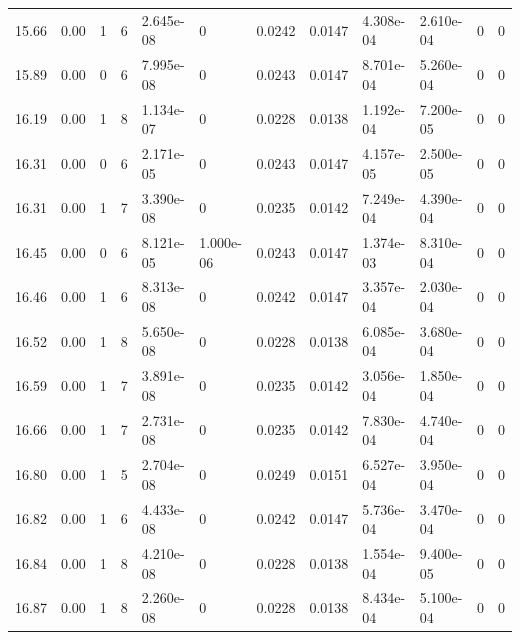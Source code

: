 \documentclass[preview]{standalone}
\begin{document}
{{{\begin{tabular}{L{1.2cm}C{1.2cm} C{0.3cm}C{0.5cm} C{1.4cm}C{1.4cm} C{1.4cm}C{1.4cm} C{1.6cm}C{1.6cm} C{1.6cm}C{1.6cm}}
  15.66  &  0.00  & 1     &  6 &  2.645e-08  & 0  &  0.0242&   0.0147& 4.308e-04 & 2.610e-04   &  0 & 0  \\ 
  15.89  &  0.00  & 0     &  6 &  7.995e-08  & 0  &  0.0243&   0.0147& 8.701e-04 & 5.260e-04   &  0 & 0  \\ 
  16.19  &  0.00  & 1     &  8 &  1.134e-07  & 0  &  0.0228&   0.0138& 1.192e-04 & 7.200e-05   &  0 & 0  \\ 
  16.31  &  0.00  & 0     &  6 &  2.171e-05  & 0  &  0.0243&   0.0147& 4.157e-05 & 2.500e-05   &  0 & 0  \\ 
  16.31  &  0.00  & 1     &  7 &  3.390e-08  & 0  &  0.0235&   0.0142& 7.249e-04 & 4.390e-04   &  0 & 0  \\ 
  16.45  &  0.00  & 0     &  6 &  8.121e-05  & 1.000e-06  &  0.0243&   0.0147& 1.374e-03 & 8.310e-04   &  0 & 0  \\ 
  16.46  &  0.00  & 1     &  6 &  8.313e-08  & 0  &  0.0242&   0.0147& 3.357e-04 & 2.030e-04   &  0 & 0  \\ 
  16.52  &  0.00  & 1     &  8 &  5.650e-08  & 0  &  0.0228&   0.0138& 6.085e-04 & 3.680e-04   &  0 & 0  \\ 
  16.59  &  0.00  & 1     &  7 &  3.891e-08  & 0  &  0.0235&   0.0142& 3.056e-04 & 1.850e-04   &  0 & 0  \\ 
  16.66  &  0.00  & 1     &  7 &  2.731e-08  & 0  &  0.0235&   0.0142& 7.830e-04 & 4.740e-04   &  0 & 0  \\ 
  16.80  &  0.00  & 1     &  5 &  2.704e-08  & 0  &  0.0249&   0.0151& 6.527e-04 & 3.950e-04   &  0 & 0  \\ 
  16.82  &  0.00  & 1     &  6 &  4.433e-08  & 0  &  0.0242&   0.0147& 5.736e-04 & 3.470e-04   &  0 & 0  \\ 
  16.84  &  0.00  & 1     &  8 &  4.210e-08  & 0  &  0.0228&   0.0138& 1.554e-04 & 9.400e-05   &  0 & 0  \\ 
  16.87  &  0.00  & 1     &  8 &  2.260e-08  & 0  &  0.0228&   0.0138& 8.434e-04 & 5.100e-04   &  0 & 0  \\ 
\hline 
\end{tabular} 

}}}
\end{document}
